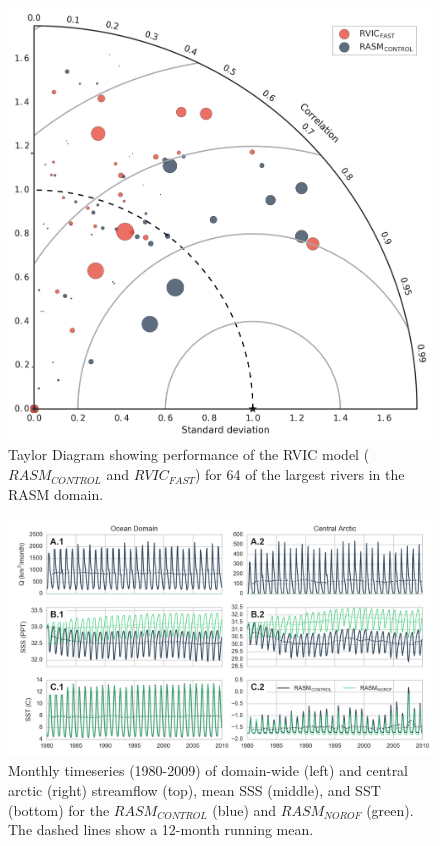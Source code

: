 \documentclass[jgrga, draft]{agutex}
\begin{document}
\clearpage
\begin{figure}
\noindent\includegraphics[width=40pc,natwidth=1]{R1010RBRbaaa01a_rvicfast_taylordiag}
\caption{Taylor Diagram showing performance of the RVIC model ($RASM_{CONTROL}$ and $RVIC_{FAST}$) for 64 of the largest rivers in the RASM domain.}
\label{fig:taylor}
\end{figure}

\clearpage
\begin{figure}
\noindent\includegraphics[width=40pc,natwidth=1]{ocean_combine_ts}
\caption{Monthly timeseries (1980-2009) of domain-wide (left) and central arctic (right) streamflow (top), mean SSS (middle), and SST (bottom) for the $RASM_{CONTROL}$ (blue) and $RASM_{NOROF}$ (green). The dashed lines show a 12-month running mean.}
\label{fig:ocean_timeseries}
\end{figure}
\end{document}
